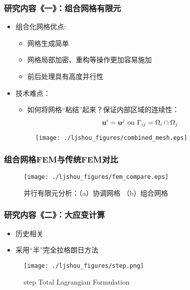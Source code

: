 \documentclass[mathserif]{beamer}
\begin{document}
\begin{CJK}{UTF8}{gkai}
		
		\begin{frame}
		\frametitle{研究内容《一》：组合网格有限元}
			\begin{itemize}
				\item 组合化网格优点: 
					\begin{itemize}
						\item 网格生成简单
						\item 网格局部加密、重构等操作更加容易施加
						\item 前后处理具有高度并行性
					\end{itemize}
				\item 技术难点：
					\begin{itemize}
						\item 如何将网格“粘结”起来？保证内部区域的连续性：
						\begin{equation}
							{\bf u}^i = {\bf u}^j \text{ on } \Gamma_{ij} = \Omega_i \cap \Omega_j
						\end{equation}
					\end{itemize}
					\begin{figure}
						\centering
						\texttt{[image: ./ljshou\_figures/combined\_mesh.eps]}
					\end{figure}
			\end{itemize}
		\end{frame}	
	
		\begin{frame}
			\frametitle{组合网格FEM与传统FEM对比}
				\begin{figure}
					\centering
					\texttt{[image: ./ljshou\_figures/fem\_compare.eps]}
					\caption{并行有限元分析：（a）协调网格 （b）组合网格}
			\end{figure}
		\end{frame}
				
	
		\begin{frame}
			\frametitle{研究内容《二》：大应变计算}
			\begin{itemize}
				\item 历史相关
				\item 采用“半”完全拉格朗日方法
			\end{itemize}
				\begin{figure}
					\centering
					\texttt{[image: ./ljshou\_figures/step.png]}
					\caption{step Total Lagrangian Formulation}
			\end{figure}
		\end{frame}	
	

\end{CJK}
\end{document}

